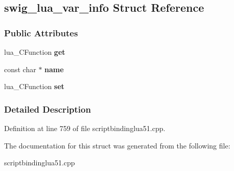 \hypertarget{structswig__lua__var__info}{
\subsection{swig\_\-lua\_\-var\_\-info Struct Reference}
\label{structswig__lua__var__info}
}
\subsubsection*{Public Attributes}
\begin{DoxyCompactItemize}
\item 
\hypertarget{structswig__lua__var__info_a56fb0b689f37015e340b35c6d7ee0b99}{
lua\_\-CFunction {\bfseries get}}
\label{structswig__lua__var__info_a56fb0b689f37015e340b35c6d7ee0b99}

\item 
\hypertarget{structswig__lua__var__info_a59daefcace30c1ffb1f58bd7829f8449}{
const char $\ast$ {\bfseries name}}
\label{structswig__lua__var__info_a59daefcace30c1ffb1f58bd7829f8449}

\item 
\hypertarget{structswig__lua__var__info_aea961df3cc15877e8354cb535bef2c1e}{
lua\_\-CFunction {\bfseries set}}
\label{structswig__lua__var__info_aea961df3cc15877e8354cb535bef2c1e}

\end{DoxyCompactItemize}


\subsubsection{Detailed Description}


Definition at line 759 of file scriptbindinglua51.cpp.



The documentation for this struct was generated from the following file:\begin{DoxyCompactItemize}
\item 
scriptbindinglua51.cpp\end{DoxyCompactItemize}
